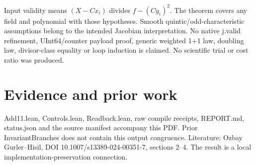 \documentclass[11pt]{article}
\begin{document}
Input validity means $(X-Cx_i)$ divides $f-(Cy_i)^2$. The theorem covers any field and polynomial with those hypotheses. Smooth quintic/odd-characteristic assumptions belong to the intended Jacobian interpretation. No native j.valid refinement, UInt64/counter payload proof, generic weighted 1+1 law, doubling law, divisor-class equality or loop induction is claimed. No scientific trial or cost ratio was produced.
\section*{Evidence and prior work}
Add11.lean, Controls.lean, Readback.lean, raw compile receipts, REPORT.md, status.json and the source manifest accompany this PDF. Prior InvariantBranches does not contain this output congruence. Literature: Ozbay Gurler--Hisil, DOI 10.1007/s13389-024-00351-7, sections 2--4. The result is a local implementation-preservation connection.
\end{document}
